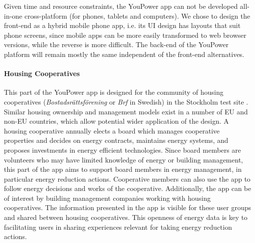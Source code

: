 \noindent Given time and resource constraints, the YouPower app can not be developed all-in-one cross-platform (for phones, tablets and computers). We chose to design the front-end as a hybrid mobile phone app, i.e. its UI design has layouts that suit phone screens, %
since mobile apps can be more easily transformed to web browser versions, while the reverse is more difficult.
The back-end of the YouPower platform will remain mostly the same independent of the front-end alternatives. 

\paragraph{Housing Cooperatives}

This part of the YouPower app is designed for the community of housing cooperatives (\textit{Bostadsr{\"a}ttsf{\"o}rening} or \textit{Brf} in Swedish) in the Stockholm test site \cite{Hasselqvist2016}.
Similar housing ownership and management models exist in a number of EU and non-EU countries, which allow potential wider application of the design.
A housing cooperative annually elects a board which manages cooperative properties and decides on energy contracts, maintains energy systems, and proposes investments in energy efficient technologies. Since board members are volunteers who may have limited knowledge of energy or building management, this part of the app aims to support board members in energy management, in particular energy reduction actions. Cooperative members can also use the app to follow energy decisions and works of the cooperative. Additionally, the app can be of interest by building management companies working with housing cooperatives. 
The information presented in the app is visible for these user
groups and shared between housing cooperatives. This openness of energy data is key to
facilitating  users in sharing experiences relevant for taking energy reduction actions.\\

